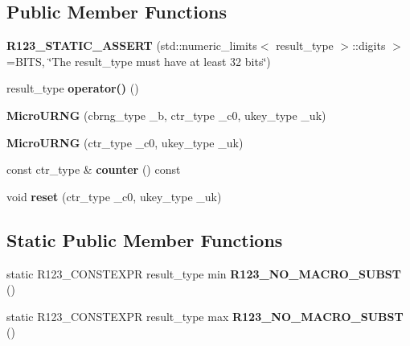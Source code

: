 \subsection*{Public Member Functions}
\begin{DoxyCompactItemize}
\item 
\hypertarget{classr123_1_1MicroURNG_a82982e0df155e33f0899867f5d7cca53}{}\label{classr123_1_1MicroURNG_a82982e0df155e33f0899867f5d7cca53} 
{\bfseries R123\+\_\+\+S\+T\+A\+T\+I\+C\+\_\+\+A\+S\+S\+E\+RT} (std\+::numeric\+\_\+limits$<$ result\+\_\+type $>$\+::digits $>$=B\+I\+TS, \char`\"{}The result\+\_\+type must have at least 32 bits\char`\"{})
\item 
\hypertarget{classr123_1_1MicroURNG_a64cd4d33b4cab5d3d9c556db68407b77}{}\label{classr123_1_1MicroURNG_a64cd4d33b4cab5d3d9c556db68407b77} 
result\+\_\+type {\bfseries operator()} ()
\item 
\hypertarget{classr123_1_1MicroURNG_a19afb80312c370e1670bf8afc73d802e}{}\label{classr123_1_1MicroURNG_a19afb80312c370e1670bf8afc73d802e} 
{\bfseries Micro\+U\+R\+NG} (cbrng\+\_\+type \+\_\+b, ctr\+\_\+type \+\_\+c0, ukey\+\_\+type \+\_\+uk)
\item 
\hypertarget{classr123_1_1MicroURNG_a7ecf43819bc96804892a78c6715f587b}{}\label{classr123_1_1MicroURNG_a7ecf43819bc96804892a78c6715f587b} 
{\bfseries Micro\+U\+R\+NG} (ctr\+\_\+type \+\_\+c0, ukey\+\_\+type \+\_\+uk)
\item 
\hypertarget{classr123_1_1MicroURNG_a1729ed31ddf93325fee2e5413c3d3817}{}\label{classr123_1_1MicroURNG_a1729ed31ddf93325fee2e5413c3d3817} 
const ctr\+\_\+type \& {\bfseries counter} () const
\item 
\hypertarget{classr123_1_1MicroURNG_add2f214254ddc2291e3b2c8b5dbe791a}{}\label{classr123_1_1MicroURNG_add2f214254ddc2291e3b2c8b5dbe791a} 
void {\bfseries reset} (ctr\+\_\+type \+\_\+c0, ukey\+\_\+type \+\_\+uk)
\end{DoxyCompactItemize}
\subsection*{Static Public Member Functions}
\begin{DoxyCompactItemize}
\item 
\hypertarget{classr123_1_1MicroURNG_aa05c857c01053cf9185406d69757b101}{}\label{classr123_1_1MicroURNG_aa05c857c01053cf9185406d69757b101} 
static R123\+\_\+\+C\+O\+N\+S\+T\+E\+X\+PR result\+\_\+type min {\bfseries R123\+\_\+\+N\+O\+\_\+\+M\+A\+C\+R\+O\+\_\+\+S\+U\+B\+ST} ()
\item 
\hypertarget{classr123_1_1MicroURNG_a3af623b6366d6e848d67d72e4b0f363c}{}\label{classr123_1_1MicroURNG_a3af623b6366d6e848d67d72e4b0f363c} 
static R123\+\_\+\+C\+O\+N\+S\+T\+E\+X\+PR result\+\_\+type max {\bfseries R123\+\_\+\+N\+O\+\_\+\+M\+A\+C\+R\+O\+\_\+\+S\+U\+B\+ST} ()
\end{DoxyCompactItemize}
